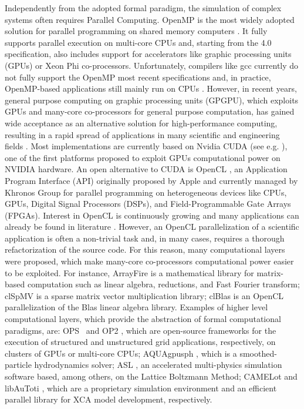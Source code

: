 Independently from the adopted formal paradigm, the simulation of
complex systems often requires Parallel Computing. OpenMP is the
most widely adopted solution for parallel programming on shared
memory computers \cite{Chapman:2007:UOP:1370966}. It fully supports
parallel execution on multi-core CPUs and, starting from the 4.0
specification, also includes support for accelerators like graphic
processing units (GPUs) or Xeon Phi co-processors. Unfortunately,
compilers like gcc currently do not fully support the OpenMP most
recent specifications and, in practice, OpenMP-based applications
still mainly run on CPUs \cite{Oliverio2011271, Amritkar2014501,
pop:hal-00786675}. However, in recent years, general purpose
computing on graphic processing units (GPGPU), which exploits GPUs
and many-core co-processors for general purpose computation, has
gained wide acceptance as an alternative solution for
high-performance computing, resulting in a rapid spread of
applications in many scientific and engineering fields
\cite{Owens200780}. Most implementations are currently based on
Nvidia CUDA (see e.g. \cite{Blecic2013, D'Ambrosio2013630,
	DiGregorio20131183, D'Ambrosio201230}), one of the first platforms
proposed to exploit GPUs computational power on NVIDIA hardware. An
open alternative to CUDA is OpenCL \cite{Stone201066}, an
Application Program Interface (API) originally proposed by Apple and
currently managed by Khronos Group for parallel programming on
heterogeneous devices like CPUs, GPUs, Digital Signal Processors
(DSPs), and Field-Programmable Gate Arrays (FPGAs). Interest in
OpenCL is continuously growing and many applications can already be
found in literature \cite{Macri2015328, Bedorf20122825, Du2012391,
	Brown2011898}. However, an OpenCL parallelization of a scientific
application is often a non-trivial task and, in many cases, requires
a thorough refactorization of the source code. For this reason, many
computational layers were proposed, which make many-core
co-processors computational power easier to be exploited. For
instance, ArrayFire \cite{Malcolm2012} is a mathematical library for
matrix-based computation such as linear algebra, reductions, and
Fast Fourier transform; clSpMV \cite{Su2012353} is a sparse matrix
vector multiplication library; clBlas \cite{clBlas-2016} is an
OpenCL parallelization of the Blas linear algebra library. Examples
of higher level computational layers, which provide the abstraction
of formal computational paradigms, are: OPS~\cite{Reguly201458,
	Jammy2016450} and OP2 \cite{Giles20131451, Reguly20161265}, which
are open-source frameworks for the execution of structured and
unstructured grid applications, respectively, on clusters of GPUs or
multi-core CPUs; AQUAgpusph \cite{Cercos-Pita2015295}, which is a
smoothed-particle hydrodynamics solver; ASL \cite{asl}, an
accelerated multi-physics simulation software based, among others,
on the Lattice Boltzmann Method; CAMELot
\cite{dattilo2003simulation, d2007parallel} and libAuToti
\cite{spingola2008modeling}, which are a proprietary simulation
environment and an efficient parallel library for XCA model
development, respectively.


